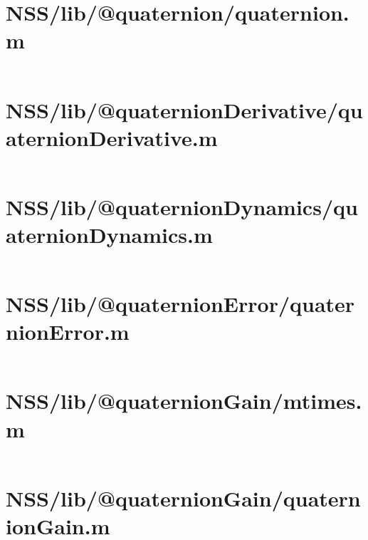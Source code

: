 \pagebreak
\section*{NSS/lib/@quaternion/quaternion.m}\label{code:NSS/lib/@quaternion/quaternion.m}
\inputminted[linenos,fontsize=\scriptsize]{matlab}{/home/dcouture/git/mathyourlife/TSatPy/beta_versions/matlab_object_oriented/lib/@quaternion/quaternion.m}

\pagebreak
\section*{NSS/lib/@quaternionDerivative/quaternionDerivative.m}\label{code:NSS/lib/@quaternionDerivative/quaternionDerivative.m}
\inputminted[linenos,fontsize=\scriptsize]{matlab}{/home/dcouture/git/mathyourlife/TSatPy/beta_versions/matlab_object_oriented/lib/@quaternionDerivative/quaternionDerivative.m}

\pagebreak
\section*{NSS/lib/@quaternionDynamics/quaternionDynamics.m}\label{code:NSS/lib/@quaternionDynamics/quaternionDynamics.m}
\inputminted[linenos,fontsize=\scriptsize]{matlab}{/home/dcouture/git/mathyourlife/TSatPy/beta_versions/matlab_object_oriented/lib/@quaternionDynamics/quaternionDynamics.m}

\pagebreak
\section*{NSS/lib/@quaternionError/quaternionError.m}\label{code:NSS/lib/@quaternionError/quaternionError.m}
\inputminted[linenos,fontsize=\scriptsize]{matlab}{/home/dcouture/git/mathyourlife/TSatPy/beta_versions/matlab_object_oriented/lib/@quaternionError/quaternionError.m}

\pagebreak
\section*{NSS/lib/@quaternionGain/mtimes.m}\label{code:NSS/lib/@quaternionGain/mtimes.m}
\inputminted[linenos,fontsize=\scriptsize]{matlab}{/home/dcouture/git/mathyourlife/TSatPy/beta_versions/matlab_object_oriented/lib/@quaternionGain/mtimes.m}

\pagebreak
\section*{NSS/lib/@quaternionGain/quaternionGain.m}\label{code:NSS/lib/@quaternionGain/quaternionGain.m}
\inputminted[linenos,fontsize=\scriptsize]{matlab}{/home/dcouture/git/mathyourlife/TSatPy/beta_versions/matlab_object_oriented/lib/@quaternionGain/quaternionGain.m}

